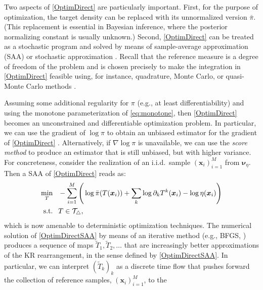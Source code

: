 \documentclass[twoside,11pt]{article}
\newcommand{\genm}{\boldsymbol{\nu} }   %
\newcommand{\xb}{\boldsymbol{x}}
\newcommand{\spaceMapT}{\mathcal{T}_\triangle}  %
\begin{document}
%
%
%
%

Two aspects of \eqref{OptimDirect} are particularly important. First,
for the purpose of optimization, the target density can be replaced
with its unnormalized version $\bar{\pi}$. (This replacement is
essential in Bayesian inference, where the posterior normalizing
constant is usually unknown.) 
%
%
%
%
%
%
%
Second, \eqref{OptimDirect} can be treated as a stochastic program and
solved by means of sample-average approximation (SAA)
%
%
or stochastic approximation
\citep{Shapiro2013,kushner2003stochastic}.  
%
%
Recall that the
reference measure is a degree of freedom of the problem and is chosen
precisely to make the integration in \eqref{OptimDirect} feasible
using, for instance, quadrature, Monte Carlo, or quasi-Monte Carlo
methods \citep{dick2013high}.
%

Assuming some additional regularity for $\pi$ (e.g., at least
differentiability) and using
the monotone parameterization of \eqref{eq:monotone}, then
\eqref{OptimDirect} becomes an unconstrained and differentiable
optimization problem.  In particular, we can use the gradient of
$\log \pi$ to obtain an unbiased estimator for the gradient of
\eqref{OptimDirect}
%
\citep{asmussen2007stochastic}.
Alternatively, if $\nabla \log \pi$ is unavailable, we can use the
{\it score method} \citep{glynn1990likelihood} 
%
to
produce an estimator that is still unbiased, but with higher variance.
For concreteness, consider the realization of an i.i.d.\ sample
$(\xb_i)_{i=1}^M$ from $\genm_\eta$.  Then 
%
a
SAA of
\eqref{OptimDirect} reads as:
%
%
%
%
%
%
%
\begin{align}  \label{OptimDirectSAA}
      \min\limits_{T}     &\phantom{=}  - \sum_{i=1}^M \left
                                                ( \,\log \bar{\pi}(T(\xb_i)) + 
      \sum_k \log \partial_k T^k(\xb_i) 
      - \log \eta(\xb_i)   \right )   \\
      {\rm s.t.}      &\phantom{=}  T \in \spaceMapT,       \nonumber
\end{align}
which is now amenable to deterministic optimization techniques. 
The numerical solution of
\eqref{OptimDirectSAA} by means of an iterative %
method
(e.g., BFGS, \citealp{wright1999numerical}) produces a sequence of maps
$\widetilde{T}_1,\widetilde{T}_2,\ldots$ that are increasingly
better approximations of the KR rearrangement, in the
sense defined by \eqref{OptimDirectSAA}.  In particular, we can
interpret $(\widetilde{T}_k)_k$ as a discrete time flow that pushes
forward the collection of reference samples, $(\xb_i)_{i=1}^M$, to the
\end{document}
